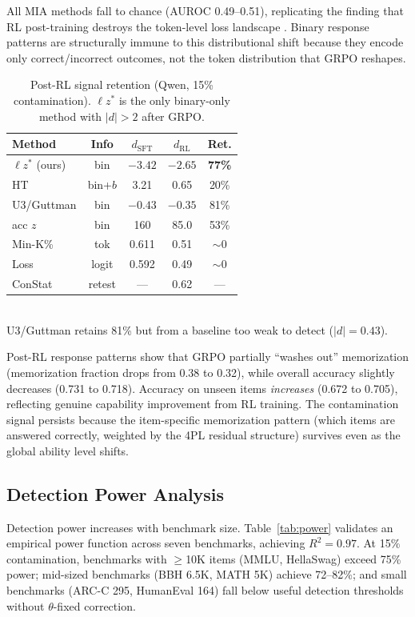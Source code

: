 \documentclass[11pt,a4paper]{article}
\newcommand{\lzstar}{$\ell z^*$}
\newcommand{\thetafixed}{$\theta$-fixed}
\begin{document}
All MIA methods fall to chance (AUROC 0.49--0.51), replicating the finding that RL post-training destroys the token-level loss landscape \citep{wang2025postrl}. Binary response patterns are structurally immune to this distributional shift because they encode only correct/incorrect outcomes, not the token distribution that GRPO reshapes.

\begin{table}[t]
\centering
\caption{Post-RL signal retention (Qwen, 15\% contamination). \lzstar{} is the only binary-only method with $|d|>2$ after GRPO.}
\label{tab:postrl}
\small
\begin{tabular}{lcccc}
\toprule
Method & Info & $d_{\text{SFT}}$ & $d_{\text{RL}}$ & Ret. \\
\midrule
$\ell z^*$ (ours) & bin & $-3.42$ & $\mathbf{-2.65}$ & \textbf{77\%} \\
HT & bin+$b$ & 3.21 & 0.65 & 20\% \\
U3/Guttman & bin & $-0.43$ & $-0.35$ & 81\% \\
acc $z$ & bin & 160 & 85.0 & 53\% \\
Min-K\% & tok & 0.611 & 0.51 & ${\sim}0$ \\
Loss & logit & 0.592 & 0.49 & ${\sim}0$ \\
ConStat & retest & --- & 0.62 & --- \\
\bottomrule
\end{tabular}
\\[2pt]
{\footnotesize U3/Guttman retains 81\% but from a baseline too weak to detect ($|d|=0.43$).}
\end{table}

Post-RL response patterns show that GRPO partially ``washes out'' memorization (memorization fraction drops from 0.38 to 0.32), while overall accuracy slightly decreases (0.731 to 0.718). Accuracy on unseen items \emph{increases} (0.672 to 0.705), reflecting genuine capability improvement from RL training. The contamination signal persists because the item-specific memorization pattern (which items are answered correctly, weighted by the 4PL residual structure) survives even as the global ability level shifts.

\subsection{Detection Power Analysis}\label{sec:power}

Detection power increases with benchmark size. Table~\ref{tab:power} validates an empirical power function across seven benchmarks, achieving $R^2 = 0.97$. At 15\% contamination, benchmarks with $\geq$10K items (MMLU, HellaSwag) exceed 75\% power; mid-sized benchmarks (BBH 6.5K, MATH 5K) achieve 72--82\%; and small benchmarks (ARC-C 295, HumanEval 164) fall below useful detection thresholds without \thetafixed{} correction.
\end{document}
